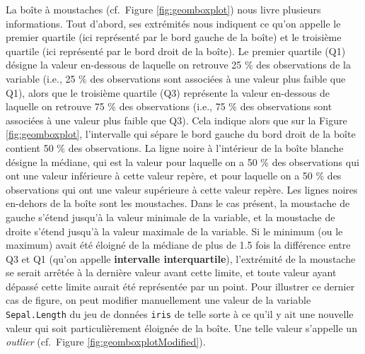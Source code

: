 \documentclass[
  french,
]{book}
\newenvironment{Shaded}{\begin{snugshade}}{\end{snugshade}}
\newcommand{\CommentTok}[1]{\textcolor[rgb]{0.56,0.35,0.01}{\textit{#1}}}
\newcommand{\DataTypeTok}[1]{\textcolor[rgb]{0.13,0.29,0.53}{#1}}
\newcommand{\DecValTok}[1]{\textcolor[rgb]{0.00,0.00,0.81}{#1}}
\newcommand{\KeywordTok}[1]{\textcolor[rgb]{0.13,0.29,0.53}{\textbf{#1}}}
\newcommand{\NormalTok}[1]{#1}
\newcommand{\OperatorTok}[1]{\textcolor[rgb]{0.81,0.36,0.00}{\textbf{#1}}}
\newcommand{\StringTok}[1]{\textcolor[rgb]{0.31,0.60,0.02}{#1}}
\begin{document}
La boîte à moustaches (cf.~Figure \ref{fig:geomboxplot}) nous livre plusieurs informations. Tout d'abord, ses extrémités nous indiquent ce qu'on appelle le premier quartile (ici représenté par le bord gauche de la boîte) et le troisième quartile (ici représenté par le bord droit de la boîte). Le premier quartile (Q1) désigne la valeur en-dessous de laquelle on retrouve 25 \% des observations de la variable (i.e., 25 \% des observations sont associées à une valeur plus faible que Q1), alors que le troisième quartile (Q3) représente la valeur en-dessous de laquelle on retrouve 75 \% des observations (i.e., 75 \% des observations sont associées à une valeur plus faible que Q3). Cela indique alors que sur la Figure \ref{fig:geomboxplot}, l'intervalle qui sépare le bord gauche du bord droit de la boîte contient 50 \% des observations. La ligne noire à l'intérieur de la boîte blanche désigne la médiane, qui est la valeur pour laquelle on a 50 \% des observations qui ont une valeur inférieure à cette valeur repère, et pour laquelle on a 50 \% des observations qui ont une valeur supérieure à cette valeur repère. Les lignes noires en-dehors de la boîte sont les moustaches. Dans le cas présent, la moustache de gauche s'étend jusqu'à la valeur minimale de la variable, et la moustache de droite s'étend jusqu'à la valeur maximale de la variable. Si le minimum (ou le maximum) avait été éloigné de la médiane de plus de 1.5 fois la différence entre Q3 et Q1 (qu'on appelle \textbf{intervalle interquartile}), l'extrémité de la moustache se serait arrêtée à la dernière valeur avant cette limite, et toute valeur ayant dépassé cette limite aurait été représentée par un point. Pour illustrer ce dernier cas de figure, on peut modifier manuellement une valeur de la variable \texttt{Sepal.Length} du jeu de données \texttt{iris} de telle sorte à ce qu'il y ait une nouvelle valeur qui soit particulièrement éloignée de la boîte. Une telle valeur s'appelle un \emph{outlier} (cf.~Figure \ref{fig:geomboxplotModified}).

\begin{Shaded}
\end{Shaded}
\end{document}
